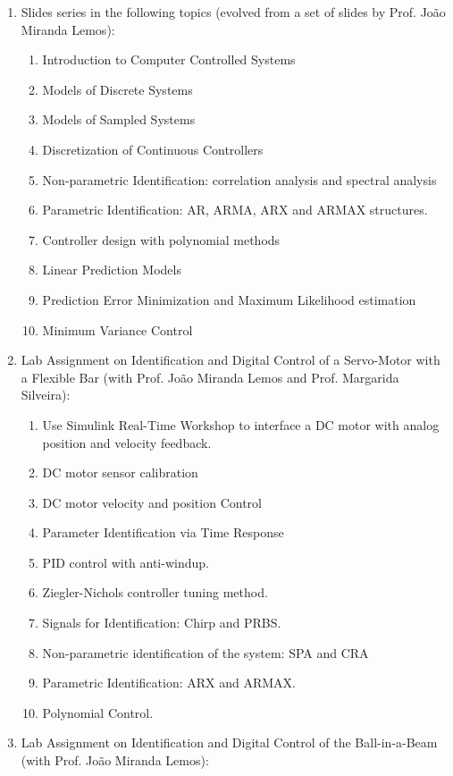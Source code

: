 \documentclass[
]{article}
\begin{document}
\begin{enumerate}
  \begin{enumerate}
  \def\labelenumii{\alph{enumii}.}
  \item
    Slides series in the following topics (evolved from a set of slides
    by Prof. João Miranda Lemos):

    \begin{enumerate}
    \def\labelenumiii{\roman{enumiii}.}
    \item
      Introduction to Computer Controlled Systems
    \item
      Models of Discrete Systems
    \item
      Models of Sampled Systems
    \item
      Discretization of Continuous Controllers
    \item
      Non-parametric Identification: correlation analysis and spectral
      analysis
    \item
      Parametric Identification: AR, ARMA, ARX and ARMAX structures.
    \item
      Controller design with polynomial methods
    \item
      Linear Prediction Models
    \item
      Prediction Error Minimization and Maximum Likelihood estimation
    \item
      Minimum Variance Control
    \end{enumerate}
  \item
    Lab Assignment on Identification and Digital Control of a
    Servo-Motor with a Flexible Bar (with Prof. João Miranda Lemos and
    Prof. Margarida Silveira):

    \begin{enumerate}
    \def\labelenumiii{\roman{enumiii}.}
    \item
      Use Simulink Real-Time Workshop to interface a DC motor with
      analog position and velocity feedback.
    \item
      DC motor sensor calibration
    \item
      DC motor velocity and position Control
    \item
      Parameter Identification via Time Response
    \item
      PID control with anti-windup.
    \item
      Ziegler-Nichols controller tuning method.
    \item
      Signals for Identification: Chirp and PRBS.
    \item
      Non-parametric identification of the system: SPA and CRA
    \item
      Parametric Identification: ARX and ARMAX.
    \item
      Polynomial Control.
    \end{enumerate}
  \item
    Lab Assignment on Identification and Digital Control of the
    Ball-in-a-Beam (with Prof. João Miranda Lemos):


\end{enumerate}
\end{enumerate}
\end{document}
